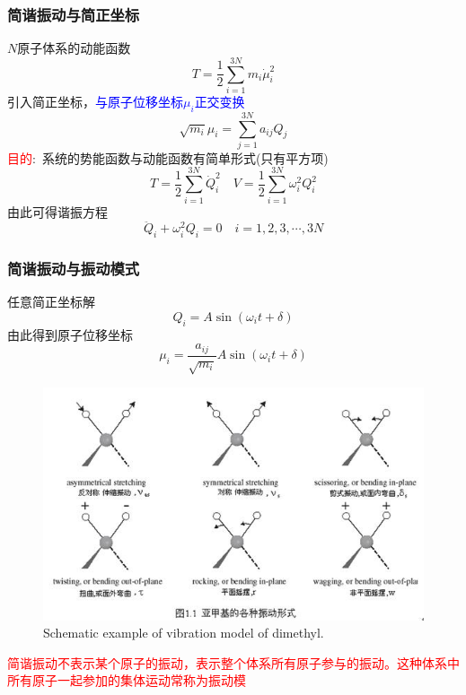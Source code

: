 \frame
{
	\frametitle{简谐振动与简正坐标}
	$N$原子体系的动能函数
	\begin{displaymath}
		T=\frac12\sum_{i=1}^{3N}m_i\dot{\mu}_i^2
	\end{displaymath}
	引入简正坐标，\textcolor{blue}{与原子位移坐标$\mu_i$正交变换}
	\begin{displaymath}
		\sqrt{m_i}\mu_i=\sum_{j=1}^{3N}a_{ij}Q_j
	\end{displaymath}
	\textcolor{red}{目的}:~系统的势能函数与动能函数有简单形式(只有平方项)
	\begin{displaymath}
			T=\frac12\sum_{i=1}^{3N}\dot{Q}_i^2\quad
			V=\frac12\sum_{i=1}^{3N}\omega_i^2Q_i^2
	\end{displaymath}
	由此可得谐振方程
	\begin{displaymath}
		\ddot{Q}_i+\omega_i^2Q_i=0\quad i=1,2,3,\cdots,3N
	\end{displaymath}

}

\frame
{
	\frametitle{简谐振动与振动模式}
	任意简正坐标解
	\begin{displaymath}
		Q_i=A\sin(\omega_it+\delta)
	\end{displaymath}
	由此得到原子位移坐标
	\begin{displaymath}
		\mu_i=\frac{a_{ij}}{\sqrt{m_i}}A\sin(\omega_it+\delta)
	\end{displaymath}
\begin{figure}[h!]
\centering
\vspace*{-0.1in}
\includegraphics[height=1.in,width=2.in,viewport=0 20 420 250,clip]{Figures/RF_vir.jpg}
\caption{\tiny \textrm{Schematic example of vibration model of dimethyl.}}%
\label{virbration_model}
\end{figure} 
\textcolor{red}{简谐振动不表示某个原子的振动，表示整个体系所有原子参与的振动。这种体系中所有原子一起参加的集体运动常称为振动模}
}

